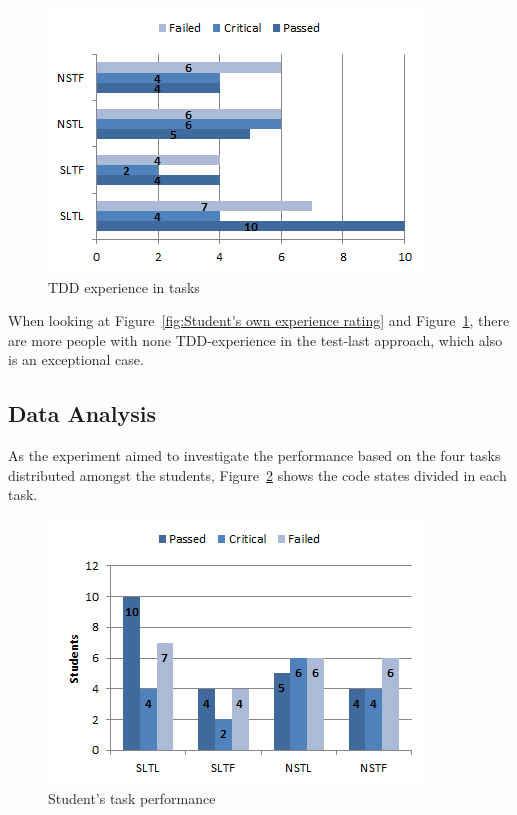 \documentclass{sig-alternate-05-2015}
\begin{document}
\begin{figure}[!ht]
	\centering
	\includegraphics[width=1\linewidth]{image04}
	\caption{TDD experience in tasks}
	\label{fig:TDD experience in tasks}
\end{figure}

When looking at Figure~\ref{fig:Student's own experience rating} and Figure~\ref{fig:TDD experience in tasks}, there are more people with none TDD-experience in the test-last approach, which also is an exceptional case.

\subsection{Data Analysis}
\label{DataAnalysis}
As the experiment aimed to investigate the performance based on the four tasks distributed amongst the students, Figure~\ref{fig:Student's task performance} shows the code states divided in each task.

\begin{figure}[!ht]
	\centering
	\includegraphics[width=1\linewidth]{img05}
	\caption{Student's task performance}
	\label{fig:Student's task performance}
\end{figure}
\end{document}
